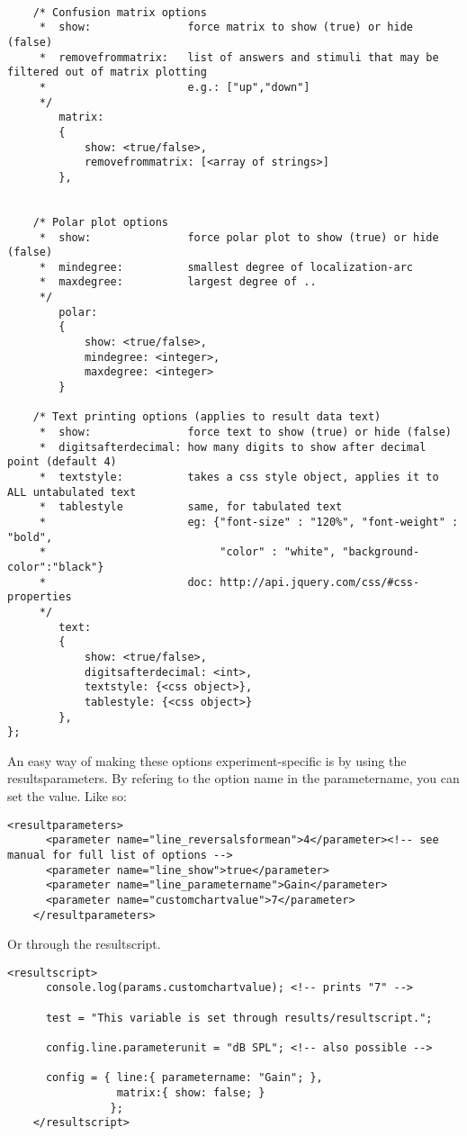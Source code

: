 \begin{lstlisting}
    
    /* Confusion matrix options
     *  show:               force matrix to show (true) or hide (false)
     *  removefrommatrix:   list of answers and stimuli that may be filtered out of matrix plotting
     *                      e.g.: ["up","down"]
     */
        matrix:
        {
            show: <true/false>,
            removefrommatrix: [<array of strings>]
        },
    
    
    /* Polar plot options
     *  show:               force polar plot to show (true) or hide (false)
     *  mindegree:          smallest degree of localization-arc
     *  maxdegree:          largest degree of ..
     */
        polar:
        {
            show: <true/false>,
            mindegree: <integer>,
            maxdegree: <integer>
        }
        
    /* Text printing options (applies to result data text)
     *  show:               force text to show (true) or hide (false)
     *  digitsafterdecimal: how many digits to show after decimal point (default 4)
     *  textstyle:          takes a css style object, applies it to ALL untabulated text
     *  tablestyle          same, for tabulated text
     *                      eg: {"font-size" : "120%", "font-weight" : "bold", 
     *                           "color" : "white", "background-color":"black"}
     *                      doc: http://api.jquery.com/css/#css-properties
     */
        text:
        {
            show: <true/false>,
            digitsafterdecimal: <int>,
            textstyle: {<css object>},
            tablestyle: {<css object>}
        },
};
\end{lstlisting}

An easy way of making these options experiment-specific is by using the resultsparameters. By refering to the option name in the parametername, you can set the value. Like so:

\begin{lstlisting}
<resultparameters>
      <parameter name="line_reversalsformean">4</parameter><!-- see manual for full list of options -->
      <parameter name="line_show">true</parameter>
      <parameter name="line_parametername">Gain</parameter>
      <parameter name="customchartvalue">7</parameter>
    </resultparameters>
\end{lstlisting}

Or through the resultscript.

\begin{lstlisting}
<resultscript>
      console.log(params.customchartvalue); <!-- prints "7" -->
      
      test = "This variable is set through results/resultscript.";
      
      config.line.parameterunit = "dB SPL"; <!-- also possible -->
      
      config = { line:{ parametername: "Gain"; },
                 matrix:{ show: false; } 
                };
    </resultscript>
\end{lstlisting}


